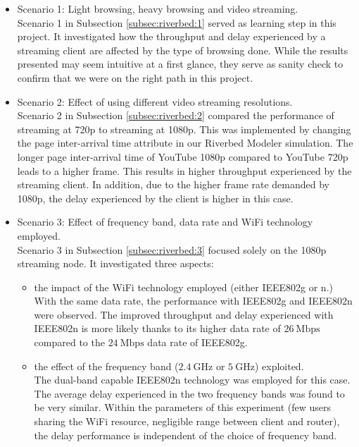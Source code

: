 \begin{itemize}
	\item Scenario 1: Light browsing, heavy browsing and video streaming.  \\
	Scenario 1 in Subsection \ref{subsec:riverbed:1} served as learning step in this project. It investigated how the throughput and delay experienced by a streaming client are affected by the type of browsing done. While the results presented may seem intuitive at a first glance, they serve as sanity check to confirm that we were on the right path in this project.
	\item Scenario 2: Effect of using different video streaming resolutions.\\
	Scenario 2 in Subsection \ref{subsec:riverbed:2} compared the performance of streaming at 720p to streaming at 1080p.
	This was implemented by changing the page inter-arrival time attribute in our Riverbed Modeler simulation. The longer page inter-arrival time of YouTube 1080p compared to YouTube 720p leads to a higher frame. This results in higher throughput experienced by the streaming client.  In addition, due to the higher frame rate demanded by 1080p, the delay experienced by the client is higher in this case.
	\item Scenario 3: Effect of frequency band, data rate and \gls{WiFi} technology employed.\\
	Scenario 3 in Subsection \ref{subsec:riverbed:3} focused solely on the 1080p streaming node. It investigated three aspects: \begin{itemize}
		\item the impact of the \gls{WiFi} technology employed (either \gls{IEEE802}g or n.)\\	With the same data rate, the performance with \gls{IEEE802}g and \gls{IEEE802}n were observed. The improved throughput and delay experienced with \gls{IEEE802}n is more likely thanks to its higher data rate of $26~\mathrm{Mbps}$ compared to the $24~\mathrm{Mbps}$ data rate of \gls{IEEE802}g. 
		\item the effect of the frequency band ($2.4~\mathrm{GHz}$ or $5~\mathrm{GHz}$) exploited.\\
		The dual-band capable \gls{IEEE802}n technology was employed for this case. The average delay experienced in the two frequency bands was found to be very similar. Within the parameters of this experiment (few users sharing the \gls{WiFi} resource, negligible range between client and router), the delay performance is independent of the choice of frequency band.

\end{itemize}
\end{itemize}
